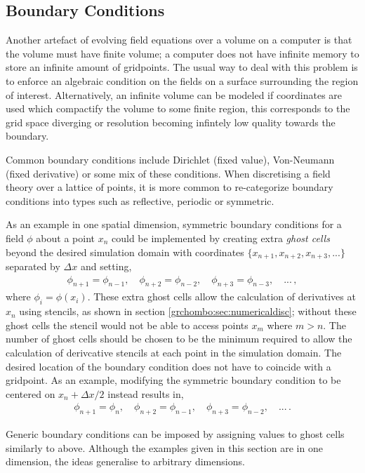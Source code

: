 \subsection{Boundary Conditions} \label{grchombo:sec:bc}
Another artefact of evolving field equations over a volume on a computer is that the volume must have finite volume; a computer does not have infinite memory to store an infinite amount of gridpoints. The usual way to deal with this problem is to enforce an algebraic condition on the fields on a surface surrounding the region of interest. Alternatively, an infinite volume can be modeled if coordinates are used which compactify the volume to some finite region, this corresponds to the grid space diverging or resolution becoming infintely low quality towards the boundary.

Common boundary conditions include Dirichlet (fixed value), Von-Neumann (fixed derivative) or some mix of these conditions. When discretising a field theory over a lattice of points, it is more common to re-categorize boundary conditions into types such as reflective, periodic or symmetric.

As an example in one spatial dimension, symmetric boundary conditions for a field $\phi$ about a point $x_n$ could be implemented by creating extra {\it ghost cells} beyond the desired simulation domain with coordinates $\{x_{n+1},x_{n+2},x_{n+3},...\}$ separated by $\Delta x$ and setting,
\begin{align}
\phi_{n+1} = \phi_{n-1}, \quad \phi_{n+2} = \phi_{n-2}, \quad \phi_{n+3} = \phi_{n-3}, \quad ... \, ,
\end{align}  
where $\phi_i = \phi(x_i)$. These extra ghost cells allow the calculation of derivatives at $x_n$ using stencils, as shown in section \ref{grchombo:sec:numericaldisc}; without these ghost cells the stencil would not be able to access points $x_{m}$ where $m>n$. The number of ghost cells should be chosen to be the minimum required to allow the calculation of derivcative stencils at each point in the simulation domain. The desired location of the boundary condition does not have to coincide with a gridpoint. As an example, modifying the symmetric boundary condition to be centered on $x_n + \Delta x /2$ instead results in,
\begin{align}
\phi_{n+1} = \phi_{n}, \quad \phi_{n+2} = \phi_{n-1}, \quad \phi_{n+3} = \phi_{n-2}, \quad ... \, .
\end{align} 

Generic boundary conditions can be imposed by assigning values to ghost cells similarly to above. Although the examples given in this section are in one dimension, the ideas generalise to arbitrary dimensions.



